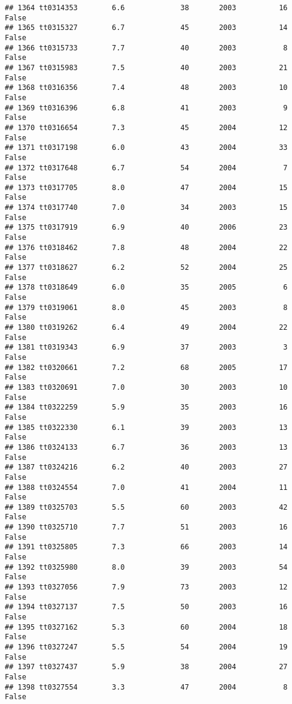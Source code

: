 \documentclass[
]{article}
\begin{document}
\begin{verbatim}
## 1364 tt0314353        6.6             38       2003          16   False
## 1365 tt0315327        6.7             45       2003          14   False
## 1366 tt0315733        7.7             40       2003           8   False
## 1367 tt0315983        7.5             40       2003          21   False
## 1368 tt0316356        7.4             48       2003          10   False
## 1369 tt0316396        6.8             41       2003           9   False
## 1370 tt0316654        7.3             45       2004          12   False
## 1371 tt0317198        6.0             43       2004          33   False
## 1372 tt0317648        6.7             54       2004           7   False
## 1373 tt0317705        8.0             47       2004          15   False
## 1374 tt0317740        7.0             34       2003          15   False
## 1375 tt0317919        6.9             40       2006          23   False
## 1376 tt0318462        7.8             48       2004          22   False
## 1377 tt0318627        6.2             52       2004          25   False
## 1378 tt0318649        6.0             35       2005           6   False
## 1379 tt0319061        8.0             45       2003           8   False
## 1380 tt0319262        6.4             49       2004          22   False
## 1381 tt0319343        6.9             37       2003           3   False
## 1382 tt0320661        7.2             68       2005          17   False
## 1383 tt0320691        7.0             30       2003          10   False
## 1384 tt0322259        5.9             35       2003          16   False
## 1385 tt0322330        6.1             39       2003          13   False
## 1386 tt0324133        6.7             36       2003          13   False
## 1387 tt0324216        6.2             40       2003          27   False
## 1388 tt0324554        7.0             41       2004          11   False
## 1389 tt0325703        5.5             60       2003          42   False
## 1390 tt0325710        7.7             51       2003          16   False
## 1391 tt0325805        7.3             66       2003          14   False
## 1392 tt0325980        8.0             39       2003          54   False
## 1393 tt0327056        7.9             73       2003          12   False
## 1394 tt0327137        7.5             50       2003          16   False
## 1395 tt0327162        5.3             60       2004          18   False
## 1396 tt0327247        5.5             54       2004          19   False
## 1397 tt0327437        5.9             38       2004          27   False
## 1398 tt0327554        3.3             47       2004           8   False

\end{verbatim}
\end{document}
